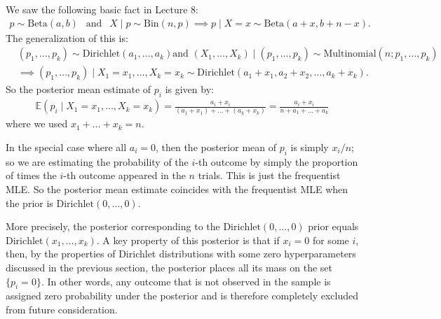 \documentclass{scrartcl}
\newcommand{\E}{{\mathbb E}}
\begin{document}
We saw the following basic fact in Lecture 8:
\begin{align*}
  p \sim \text{Beta}(a, b) ~~ \text{ and } ~~ X \mid p \sim
  \text{Bin}(n, p) \implies p \mid X = x \sim \text{Beta}(a + x, b + n
  - x). 
\end{align*}
The generalization of this is:
\begin{align*}
&  (p_1, \dots, p_k) \sim \text{Dirichlet}(a_1, \dots, a_k)  \text{
  and }  (X_1, \dots, X_k) \mid (p_1, \dots, p_k) \sim 
  \text{Multinomial}(n; p_1, \dots, p_k) \\
& \implies (p_1, \dots, p_k) \mid X_1 = x_1, \dots, X_k = x_k \sim
  \text{Dirichlet}(a_1 + x_1, a_2 + x_2, \dots, a_k + x_k). 
\end{align*}
So the posterior mean estimate of $p_i$ is given by:
\begin{align*}
  \E (p_i \mid X_1 = x_1, \dots, X_k = x_k) = \frac{a_i + x_i}{(a_1 +
  x_1) + \dots + (a_k + x_k)} = \frac{a_i + x_i}{n + a_1 + \dots +
  a_k}
\end{align*}
where we used $x_1 + \dots + x_k = n$.

In the special case where all $a_i = 0$, then the posterior mean of
$p_i$ is simply $x_i/n$; so we are estimating the probability of the
$i$-th outcome by simply the proportion of times the $i$-th outcome
appeared in the $n$ trials. This is just the frequentist MLE. So the
posterior mean estimate coincides with the frequentist MLE when the
prior is $\text{Dirichlet}(0, \dots, 0)$.

More precisely, the posterior corresponding to the
$\text{Dirichlet}(0, \dots, 0)$ prior equals  $\text{Dirichlet}(x_1,
\dots, x_k)$. A key property of this posterior is that if $x_i = 0$ for
some $i$, then, by the properties of Dirichlet distributions with some
zero hyperparameters discussed in the previous section, the posterior
places all its mass on the set $\{p_i = 0\}$. In other words, any
outcome that is not observed in the sample is assigned zero
probability under the posterior and is therefore completely excluded
from future consideration.






  
\end{document}
